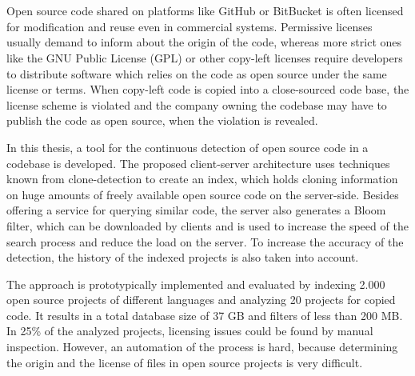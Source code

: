 \chapter{\abstractname}
Open source code shared on platforms like GitHub or BitBucket is often licensed for modification and reuse even in commercial systems.
Permissive licenses usually demand to inform about the origin of the code, whereas more strict ones like the GNU Public License (GPL) or other copy-left licenses require developers to distribute software which relies on the code as open source under the same license or terms.
When copy-left code is copied into a close-sourced code base, the license scheme is violated and the company owning the codebase may have to publish the code as open source, when the violation is revealed.

In this thesis, a tool for the continuous detection of open source code in a codebase is developed.
The proposed client-server architecture uses techniques known from clone-detection to create an index, which holds cloning information on huge amounts of freely available open source code on the server-side.
Besides offering a service for querying similar code, the server also generates a Bloom filter, which can be downloaded by clients and is used to increase the speed of the search process and reduce the load on the server.
To increase the accuracy of the detection, the history of the indexed projects is also taken into account.

The approach is prototypically implemented and evaluated by indexing 2.000 open source projects of different languages and analyzing 20 projects for copied code.
It results in a total database size of 37 GB and filters of less than 200 MB.
In 25\% of the analyzed projects, licensing issues could be found by manual inspection.
However, an automation of the process is hard, because determining the origin and the license of files in open source projects is very difficult.